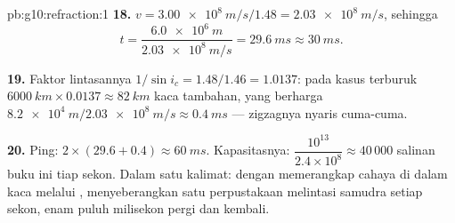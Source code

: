 \begin{solution}{pb:g10:refraction:1}
\textbf{18.} $v = \qty{3.00e8}{m/s}/1.48 = \qty{2.03e8}{m/s}$, sehingga
\[
t = \frac{\qty{6.0e6}{m}}{\qty{2.03e8}{m/s}} = \qty{29.6}{ms} \approx
\qty{30}{ms}.
\]

\textbf{19.} Faktor lintasannya $1/\sin i_c = 1.48/1.46 = 1.0137$: pada
kasus terburuk $\qty{6000}{km} \times 0.0137 \approx \qty{82}{km}$ kaca
tambahan, yang berharga $\qty{8.2e4}{m} / \qty{2.03e8}{m/s} \approx \qty{0.4}{ms}$ --- zigzagnya nyaris cuma-cuma.

\textbf{20.} Ping: $2 \times (29.6 + 0.4) \approx \qty{60}{ms}$.
Kapasitasnya: $\dfrac{10^{13}}{2.4 \times 10^8} \approx 40\,000$
salinan buku ini tiap sekon. Dalam satu kalimat: dengan memerangkap
cahaya di dalam kaca melalui , 
menyeberangkan satu perpustakaan melintasi samudra setiap sekon, enam
puluh milisekon pergi dan kembali.
\end{solution}
